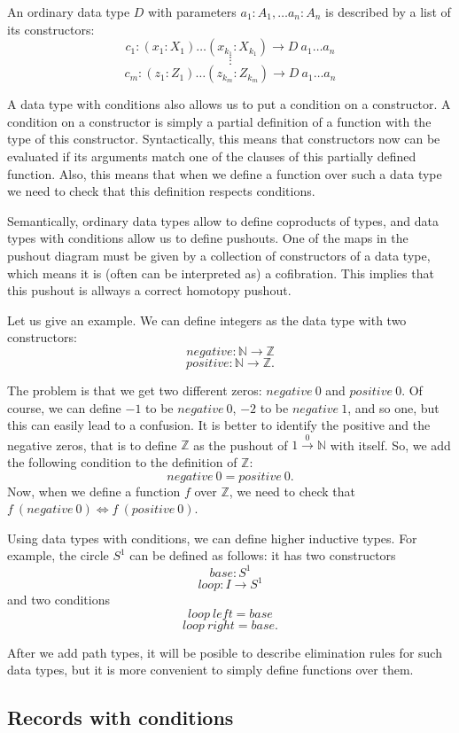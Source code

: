 \documentclass{amsart}
\theoremstyle{definition}
\theoremstyle{remark}
\newcommand{\deq}{\Leftrightarrow}
\numberwithin{figure}{section}
\begin{document}
An ordinary data type $D$ with parameters $a_1 : A_1, \ldots a_n : A_n$ is described by a list of its constructors:
\[ c_1 : (x_1 : X_1) \ldots (x_{k_1} : X_{k_1}) \to D\ a_1 \ldots a_n \]
\[ \vdots \]
\[ c_m : (z_1 : Z_1) \ldots (z_{k_m} : Z_{k_m}) \to D\ a_1 \ldots a_n \]

A data type with conditions also allows us to put a condition on a constructor.
A condition on a constructor is simply a partial definition of a function with the type of this constructor.
Syntactically, this means that constructors now can be evaluated if its arguments match one of the clauses of this partially defined function.
Also, this means that when we define a function over such a data type we need to check that this definition respects conditions.

Semantically, ordinary data types allow to define coproducts of types, and data types with conditions allow us to define pushouts.
One of the maps in the pushout diagram must be given by a collection of constructors of a data type, which means it is (often can be interpreted as) a cofibration.
This implies that this pushout is allways a correct homotopy pushout.

Let us give an example. We can define integers as the data type with two constructors:
\[ negative : \mathbb{N} \to \mathbb{Z} \]
\[ positive : \mathbb{N} \to \mathbb{Z}. \]

The problem is that we get two different zeros: $negative\ 0$ and $positive\ 0$.
Of course, we can define $-1$ to be $negative\ 0$, $-2$ to be $negative\ 1$, and so one, but this can easily lead to a confusion.
It is better to identify the positive and the negative zeros, that is to define $\mathbb{Z}$ as the pushout of $1 \overset{0}\to \mathbb{N}$ with itself.
So, we add the following condition to the definition of $\mathbb{Z}$:
\[ negative\ 0 = positive\ 0. \]
Now, when we define a function $f$ over $\mathbb{Z}$, we need to check that $f\ (negative\ 0) \deq f\ (positive\ 0)$.

Using data types with conditions, we can define higher inductive types.
For example, the circle $S^1$ can be defined as follows: it has two constructors
\[ base : S^1 \]
\[ loop : I \to S^1 \]
and two conditions
\[ loop\ left = base \]
\[ loop\ right = base. \]

After we add path types, it will be posible to describe elimination rules for such data types,
but it is more convenient to simply define functions over them.

\subsection{Records with conditions}
\end{document}
